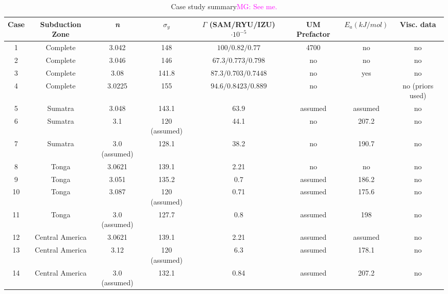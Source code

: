 \documentclass[12pt]{article}
\newcommand{\mgnote}[1]{\textcolor{magenta}{MG: #1}}
\begin{document}
\begin{table}

\centering

	\begin{table}[H]
		\caption{Case study summary\mgnote{See me.}} %
		\centering  %
		\begin{tabular}{c c c c c c c c  } %
		\hline \hline                        %
		Case & Subduction Zone & \textit{n} &$\sigma_y$&$\Gamma$ (SAM/RYU/IZU) $\cdot 10^{-5}$ &UM Prefactor &$E_a (kJ/mol)$&Visc. data   \\ [0.5ex] %
		\hline                  %
	      	 1 &Complete& 3.042 & 148 & $100/0.82/0.77$ &  4700& no & no  \\
	        2 &Complete& 3.046 & 146 & $67.3/0.773/0.798$ & no & no & no \\
	        3 &Complete& 3.08 & 141.8 & $87.3/0.703/0.7448$ & no & yes & no \\
	        4 &Complete& 3.0225 & 155 & $94.6/0.8423/0.889$ & no & & no (priors used) \\
                5 &Sumatra& 3.048 & 143.1 & $63.9$ &  assumed& assumed& no \\

                 6 &Sumatra& 3.1 & 120 (assumed) & 44.1 & no & 207.2   &no\\
                  7 &Sumatra& 3.0 (assumed) & 128.1 & 38.2 & no & 190.7   &no\\
              8 &Tonga  & 3.0621 & 139.1 & 2.21& no & no &no  \\              
               9 &Tonga  & 3.051 & 135.2 & 0.7& assumed & 186.2 &no  \\             
              10 &Tonga  & 3.087 &  120 (assumed) & 0.71 &assumed &175.6  &no  \\              
               11 &Tonga  & 3.0 (assumed) & 127.7 & 0.8 &assumed &198  &no  \\             
               12 &Central America  & 3.0621 & 139.1 & 2.21& assumed & assumed &no  \\             
                 13 &Central America  & 3.12 & 120 (assumed) & 6.3& assumed & 178.1 &no  \\         
                 14 &Central America  & 3.0 (assumed) & 132.1 & 0.84& assumed& 207.2 &no  \\        
          
          
                \hline %
		\end{tabular}
		\label{table:inversions} %
		\end{table}
\end{table}
\end{document}
